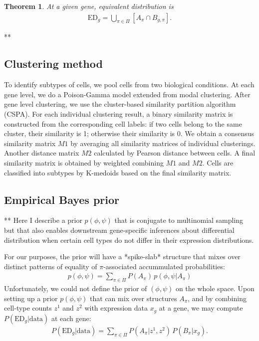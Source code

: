 \documentclass[11pt]{amsart}
\newtheorem{theorem}{Theorem}
\begin{document}
\begin{theorem}  At a given gene, equivalent distribution is
\begin{eqnarray*}
\text{ED}_g = \bigcup_{\pi \in \Pi}\left[ A_\pi \cap B_{g,\pi} \right].
\end{eqnarray*}
\end{theorem}


**
\subsection{Clustering method}
To identify subtypes of cells, we pool cells from two biological conditions. At each gene level, we do a Poison-Gamma model extended from modal clustering\cite{ref:dahl}. After gene level clustering, we use the cluster-based similarity partition algorithm (CSPA\cite{ref:cspa}). For each individual clustering result, a binary similarity matrix is constructed from the corresponding cell labels: if two cells belong to the same cluster, their similarity is 1; otherwise their similarity is 0. We obtain a consensus similarity matrix $M1$ by averaging all similarity matrices of individual clusterings. Another distance matrix $M2$ calculated by Pearson distance between cells. A final similarity matrix is obtained by weighted combining $M1$ and $M2$. Cells are classified into subtypes by K-medoids based on the final similarity matrix.



\subsection{Empirical Bayes prior}

**
Here I describe a prior $p(\phi,\psi)$ that is conjugate to multinomial
sampling but that also enables downstream gene-specific inferences about
differential distribution when certain 
cell types do not differ in their expression
distributions.  


For our purposes, the prior will have a *spike-slab* structure that mixes
over distinct patterns of equality of $\pi$-associated
accummulated probabilities:
\begin{eqnarray*}
p(\phi,\psi) = \sum_{\pi \in \Pi} P(A_\pi) \, p(\phi,\psi| A_\pi )
\end{eqnarray*}
Unfortunately, we could not define the prior of $(\phi,\psi)$ on the whole space. 
Upon setting up a prior $p(\phi,\psi)$ that can mix over structures
$A_\pi$, and by combining cell-type counts $z^1$ and $z^2$ with
expression data $x_g$ at a gene, we may compute 
$P(\text{ED}_g|\text{data})$ 
at each gene:
\begin{align}
P(\text{ED}_g|\text{data}) = \sum_{\pi \in \Pi} P(A_\pi|z^1, z^2) \, 
P(B_\pi|x_g).
\end{align}
\end{document}
